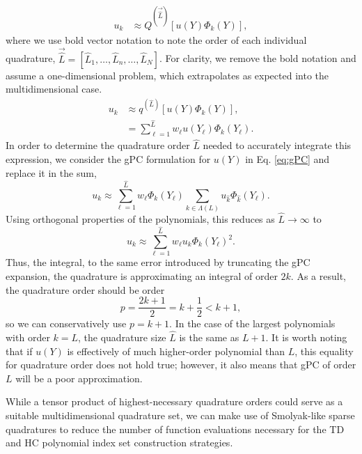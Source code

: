 \begin{align}
  u_k &\approx Q^{(\vec{\hat L})}[u(Y)\Phi_k(Y)],
\end{align}
where we use bold vector notation to note the order of each individual quadrature,
$\vec{\hat L} = [\hat L_1, \ldots,\hat L_n,\ldots,\hat L_N]$. For clarity, we remove the bold notation and
assume a one-dimensional problem, which extrapolates as expected into the multidimensional case.
\begin{align}
  u_k &\approx q^{(\hat L)}[u(Y)\Phi_k(Y)],\\
      &= \sum_{\ell=1}^{\hat L} w_\ell u(Y_\ell)\Phi_k(Y_\ell).
\end{align}
In order to determine the quadrature order $\hat L$ needed to accurately integrate this expression, we consider the
gPC formulation for $u(Y)$ in Eq. \ref{eq:gPC} and replace it in the sum,
\begin{equation}
  u_k\approx \sum_{\ell=1}^{\hat L} w_\ell \Phi_k(Y_\ell) \sum_{k\in\Lambda(L)}u_{\hat k}\Phi_{\hat k}(Y_\ell).
\end{equation}
Using orthogonal properties of the polynomials, this reduces as $\hat L\to\infty$ to
\begin{equation}
  u_k\approx \sum_{\ell=1}^{\hat L} w_\ell u_k \Phi_k(Y_\ell)^2.
\end{equation}
Thus, the integral, to the same error introduced by truncating the  gPC expansion, the quadrature is
approximating an integral of order $2k$. As a result, the quadrature order should be order 
\begin{equation}
  p=\frac{2k+1}{2}=k+\frac{1}{2}<k+1,
\end{equation}
so we can conservatively use $p=k+1$.  In the case of the largest polynomials with order
$k=L$, the quadrature size $\hat L$ is the same as $L+1$.  It is worth noting that if $u(Y)$ is effectively of
much higher-order polynomial than $L$, this equality for quadrature order does not hold true; however, it also
means that gPC of order $L$ will be a poor approximation.

While a tensor product of highest-necessary quadrature orders could serve as a suitable multidimensional
quadrature set, we can make use of Smolyak-like sparse quadratures to reduce the number of function
evaluations necessary for the TD and HC polynomial index set construction strategies.

